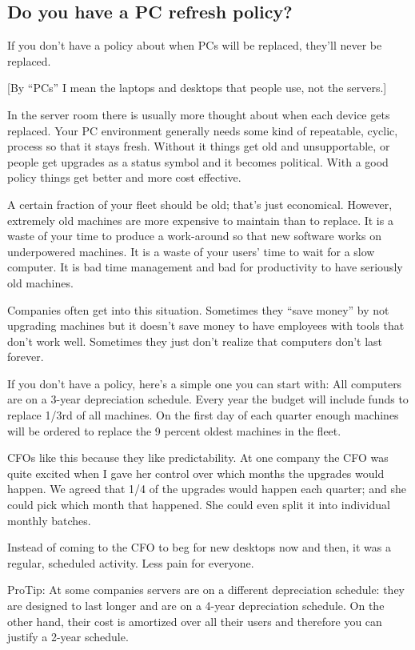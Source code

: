\documentclass{article}
\begin{document}
\subsection{Do you have a PC refresh policy?}
If you don't have a policy about when PCs will be replaced, they'll never be replaced.

[By ``PCs'' I mean the laptops and desktops that people use, not the servers.]

In the server room there is usually more thought about when each device gets replaced. Your PC environment generally needs some kind of repeatable, cyclic, process so that it stays fresh. Without it things get old and unsupportable, or people get upgrades as a status symbol and it becomes political. With a good policy things get better and more cost effective.

A certain fraction of your fleet should be old; that's just economical. However, extremely old machines are more expensive to maintain than to replace. It is a waste of your time to produce a work-around so that new software works on underpowered machines. It is a waste of your users' time to wait for a slow computer. It is bad time management and bad for productivity to have seriously old machines.

Companies often get into this situation. Sometimes they ``save money'' by not upgrading machines but it doesn't save money to have employees with tools that don't work well. Sometimes they just don't realize that computers don't last forever.

If you don't have a policy, here's a simple one you can start with: All computers are on a 3-year depreciation schedule. Every year the budget will include funds to replace 1/3rd of all machines. On the first day of each quarter enough machines will be ordered to replace the 9 percent oldest machines in the fleet.

CFOs like this because they like predictability. At one company the CFO was quite excited when I gave her control over which months the upgrades would happen. We agreed that 1/4 of the upgrades would happen each quarter; and she could pick which month that happened. She could even split it into individual monthly batches.

Instead of coming to the CFO to beg for new desktops now and then, it was a regular, scheduled activity. Less pain for everyone.

ProTip: At some companies servers are on a different depreciation schedule: they are designed to last longer and are on a 4-year depreciation schedule. On the other hand, their cost is amortized over all their users and therefore you can justify a 2-year schedule.
\end{document}
